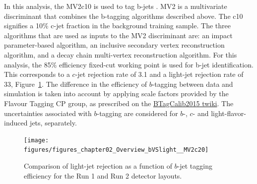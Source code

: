 \indent In this analysis, the MV2c10 is used to tag b-jets \cite{ATL-PHYS-PUB-2016-012}. MV2 is a multivariate discriminant that combines the b-tagging algorithms described above. The c10 signifies a 10\% c-jet fraction in the background training sample. The three algorithms that are used as inputs to the MV2 discriminant are: an impact parameter-based algorithm, an inclusive secondary vertex reconstruction algorithm, and a decay chain multi-vertex reconstruction algorithm. For this analysis, the 85\% efficiency fixed-cut working point is used for b-jet identification. This corresponds to a $c$-jet rejection rate of 3.1 and a light-jet rejection rate of 33, Figure~\ref{fig:bjetrej}. \newline
\indent The difference in the efficiency of $b$-tagging between data and simulation 
is taken into account by applying scale factors provided by the Flavour Tagging CP group, 
as prescribed on the \href{https://twiki.cern.ch/twiki/bin/view/AtlasProtected/BTagCalib2015}{BTagCalib2015 twiki}. 
The uncertainties associated with $b$-tagging are considered for $b$-, $c$- and light-flavor-induced jets, separately. 

\begin{figure}[h]
\begin{center}
\texttt{[image: figures/figures\_chapter02\_Overview\_bVSlight\_\_MV2c20]}
\caption[Comparison of light-jet rejection as a function of $b$-jet tagging efficiency]{Comparison of light-jet rejection as a function of $b$-jet tagging efficiency for the Run 1 and Run 2 detector layouts.\cite{Abbott:2018ikt}}
\label{fig:bjetrej}
\end{center}
\end{figure}

